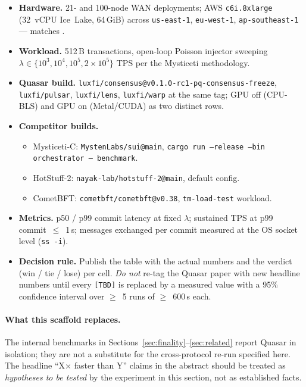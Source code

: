 \begin{itemize}[leftmargin=2em,nosep]
  \item \textbf{Hardware.} 21- and 100-node WAN deployments; AWS
        \texttt{c6i.8xlarge} (32~vCPU Ice~Lake, 64\,GiB) across
        \texttt{us-east-1}, \texttt{eu-west-1}, \texttt{ap-southeast-1}
        --- matches \cite[\S6.1]{babel2024mysticeti}.
  \item \textbf{Workload.} 512\,B transactions, open-loop Poisson
        injector sweeping $\lambda \in \{10^3, 10^4, 10^5, 2\!\times\!10^5\}$
        TPS per the Mysticeti methodology.
  \item \textbf{Quasar build.} \texttt{luxfi/consensus@v0.1.0-rc1-pq-consensus-freeze},
        \texttt{luxfi/pulsar}, \texttt{luxfi/lens}, \texttt{luxfi/warp}
        at the same tag; GPU off (CPU-BLS) and GPU on (Metal/CUDA) as
        two distinct rows.
  \item \textbf{Competitor builds.}
  \begin{itemize}[leftmargin=2em,nosep]
    \item Mysticeti-C: \texttt{MystenLabs/sui@main}, \texttt{cargo run --release --bin orchestrator -- benchmark}.
    \item HotStuff-2: \texttt{nayak-lab/hotstuff-2@main}, default config.
    \item CometBFT: \texttt{cometbft/cometbft@v0.38}, \texttt{tm-load-test} workload.
  \end{itemize}
  \item \textbf{Metrics.} p50 / p99 commit latency at fixed $\lambda$;
        sustained TPS at p99 commit~$\leq$~1\,s; messages exchanged per
        commit measured at the OS socket level (\texttt{ss -i}).
  \item \textbf{Decision rule.} Publish the table with the actual numbers
        and the verdict (win / tie / lose) per cell. \emph{Do not} re-tag
        the Quasar paper with new headline numbers until every
        \texttt{[TBD]} is replaced by a measured value with a 95\%
        confidence interval over $\geq$~5 runs of $\geq$~600\,s each.
\end{itemize}

\paragraph{What this scaffold replaces.} The internal benchmarks in
Sections~\ref{sec:finality}--\ref{sec:related} report Quasar in isolation;
they are not a substitute for the cross-protocol re-run specified here.
The headline ``X$\times$ faster than Y'' claims in the abstract should be
treated as \emph{hypotheses to be tested} by the experiment in this
section, not as established facts.

